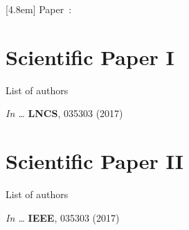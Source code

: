 
\renewcommand{\chaptertitlename}{PAPER} 
\renewcommand\thechapter{\Alph{chapter}}
\renewcommand{\chaptername}{Paper}
\renewcommand\thesection{\arabic{section}}

  [4.8em]%
  {\vspace*{1em}\bfseries\normalsize}%
  {\hspace*{-4.8em}Paper\ \thecontentslabel:\quad}%
  {}%
  {\normalsize\hfill\contentspage}%


\pagestyle{pdfpapers} 
\renewcommand{\boxsizept}{60pt} 
\chapter{Scientific Paper I}
\thispagestyle{empty}

\noindent List of authors\vspace{3ex}

\noindent \textit{In \Proc \IntlConf \ldots} \textbf{LNCS}, 035303 (2017)
\cleardoublepage



\renewcommand{\boxsizept}{52pt}
\chapter{Scientific Paper II}
\thispagestyle{empty}

\noindent List of authors\vspace{3ex}

\noindent \textit{In \Proc \IntlConf \ldots} \textbf{IEEE}, 035303 (2017)
\cleardoublepage


